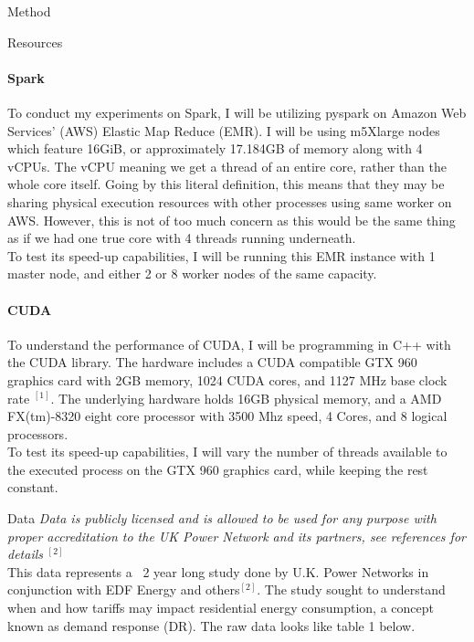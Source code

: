 \documentclass[11pt]{article}
\begin{document}
\begin{section}{Method}
	\begin{subsection}{Resources}
		\paragraph{Spark}
			To conduct my experiments on Spark, I will be utilizing pyspark on Amazon Web Services' (AWS) Elastic Map Reduce (EMR). I will be using m5Xlarge nodes which feature 16GiB, or approximately 17.184GB of memory along with 4 vCPUs. The vCPU meaning we get a thread of an entire core, rather than the whole core itself. Going by this literal definition, this means that they may be sharing physical execution resources with other processes using same worker on AWS. However, this is not of too much concern as this would be the same thing as if we had one true core with 4 threads running underneath.
			\\
			To test its speed-up capabilities, I will be running this EMR instance with 1 master node, and either 2 or 8 worker nodes of the same capacity.
		\paragraph{CUDA}
			To understand the performance of CUDA, I will be programming in C++ with the CUDA library. The hardware includes a CUDA compatible GTX 960 graphics card with 2GB memory, 1024 CUDA cores, and 1127 MHz base clock rate $^{[1]}$. The underlying hardware holds 16GB physical memory, and a AMD FX(tm)-8320 eight core processor with 3500 Mhz speed, 4 Cores, and 8 logical processors.
			\\
			To test its speed-up capabilities, I will vary the number of threads available to the executed process on the GTX 960 graphics card, while keeping the rest constant.	
		
	\end{subsection}
	\begin{subsection}{Data}
		\textit{Data is publicly licensed and is allowed to be used for any purpose with proper accreditation to the UK Power Network and its partners, see references for details} $^{[2]}$
		\\
		This data represents a ~2 year long study done by U.K. Power Networks in conjunction with EDF Energy and others$^{[2]}$. The study sought to understand when and how tariffs may impact residential energy consumption, a concept known as demand response (DR). The raw data looks like table 1 below.
		\\ 
		

\end{subsection}
\end{section}
\end{document}
